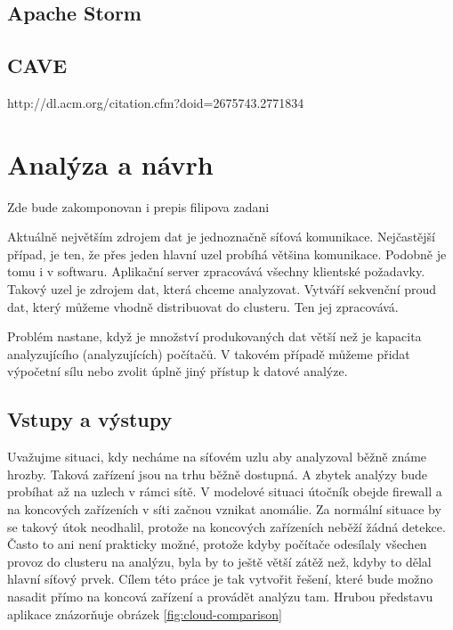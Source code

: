 \documentclass[
  digital, %
  table,   %
  nolof,     %
  nolot,     %
  twoside,
  nocover,
  monochrome,
  12pt
]{fithesis3}
\begin{document}
\section{Apache Storm}
\section{CAVE}
http://dl.acm.org/citation.cfm?doid=2675743.2771834
\chapter{Analýza a návrh}
Zde bude zakomponovan i prepis filipova zadani
 
Aktuálně největším zdrojem dat je jednoznačně síťová komunikace. Nejčastější případ, je ten, že přes jeden hlavní uzel probíhá většina komunikace. Podobně je tomu i v softwaru. Aplikační server zpracovává všechny klientské požadavky. Takový uzel je zdrojem dat, která chceme analyzovat. Vytváří sekvenční proud dat, který můžeme vhodně distribuovat do clusteru. Ten jej zpracovává.

Problém nastane, když je množství produkovaných dat větší než je kapacita analyzujícího (analyzujících) počítačů. V takovém případě můžeme přidat výpočetní sílu nebo zvolit úplně jiný přístup k datové analýze.

\section{Vstupy a výstupy}
Uvažujme situaci, kdy necháme na síťovém uzlu aby analyzoval běžně známe hrozby. Taková zařízení jsou na trhu běžně dostupná. A zbytek analýzy bude probíhat až na uzlech v rámci sítě. V modelové situaci útočník obejde firewall a na koncových zařízeních v síti začnou vznikat anomálie. Za normální situace by se takový útok neodhalil, protože na koncových zařízeních neběží žádná detekce. Často to ani není prakticky možné, protože kdyby počítače odesílaly všechen provoz do clusteru na analýzu, byla by to ještě větší zátěž než, kdyby to dělal hlavní síťový prvek. Cílem této práce je tak vytvořit řešení, které bude možno nasadit přímo na koncová zařízení a provádět analýzu tam. Hrubou představu aplikace znázorňuje obrázek \ref{fig:cloud-comparison}
\end{document}
